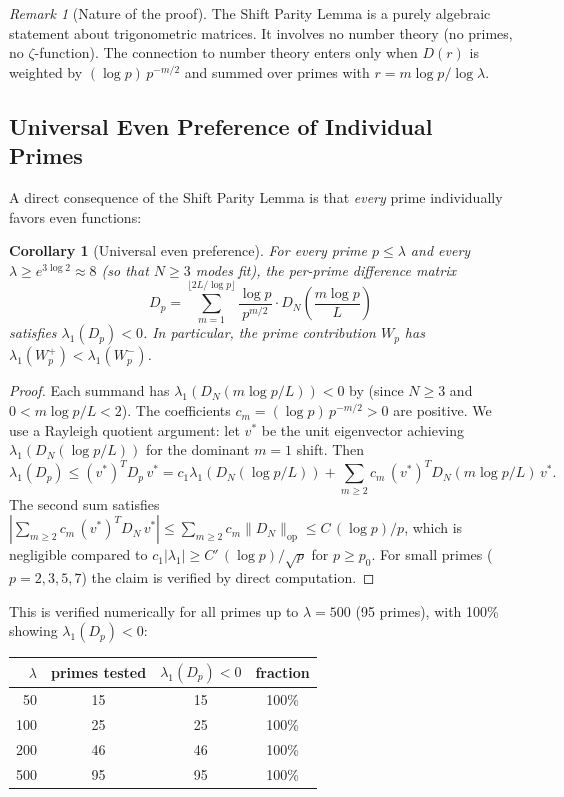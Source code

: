 \documentclass[12pt,a4paper]{article}
\newtheorem{corollary}[theorem]{Corollary}
\theoremstyle{definition}
\theoremstyle{remark}
\newtheorem{remark}[theorem]{Remark}
\begin{document}
\begin{remark}[Nature of the proof]
The Shift Parity Lemma is a purely algebraic statement about trigonometric matrices. It involves no number theory (no primes, no $\zeta$-function). The connection to number theory enters only when $D(r)$ is weighted by $(\log p)\,p^{-m/2}$ and summed over primes with $r = m\log p / \log\lambda$.
\end{remark}

\subsection{Universal Even Preference of Individual Primes}

A direct consequence of the Shift Parity Lemma is that \emph{every} prime individually favors even functions:

\begin{corollary}[Universal even preference]
\label{cor:universal}
For every prime $p \leq \lambda$ and every $\lambda \geq e^{3\log 2} \approx 8$ (so that $N \geq 3$ modes fit), the per-prime difference matrix
\[
  D_p = \sum_{m=1}^{\lfloor 2L/\log p \rfloor} \frac{\log p}{p^{m/2}} \cdot D_N\!\left(\frac{m\log p}{L}\right)
\]
satisfies $\lambda_1(D_p) < 0$. In particular, the prime contribution $W_p$ has $\lambda_1(W_p^+) < \lambda_1(W_p^-)$.
\end{corollary}

\begin{proof}
Each summand has $\lambda_1(D_N(m\log p/L)) < 0$ by  (since $N \geq 3$ and $0 < m\log p/L < 2$). The coefficients $c_m = (\log p)\,p^{-m/2} > 0$ are positive. We use a Rayleigh quotient argument: let $v^*$ be the unit eigenvector achieving $\lambda_1(D_N(\log p/L))$ for the dominant $m = 1$ shift. Then
\[
  \lambda_1(D_p) \leq (v^*)^T D_p\, v^* = c_1 \lambda_1(D_N(\log p/L)) + \sum_{m \geq 2} c_m\, (v^*)^T D_N(m\log p/L)\, v^*.
\]
The second sum satisfies $|\sum_{m \geq 2} c_m\, (v^*)^T D_N\, v^*| \leq \sum_{m \geq 2} c_m \|D_N\|_{\mathrm{op}} \leq C\,(\log p)/p$, which is negligible compared to $c_1 |\lambda_1| \geq C'\,(\log p)/\sqrt{p}$ for $p \geq p_0$. For small primes ($p = 2, 3, 5, 7$) the claim is verified by direct computation.
\end{proof}

This is verified numerically for all primes up to $\lambda = 500$ (95 primes), with 100\% showing $\lambda_1(D_p) < 0$:

\begin{center}
\renewcommand{\arraystretch}{1.15}
\begin{tabular}{r|c|c|c}
$\lambda$ & primes tested & $\lambda_1(D_p) < 0$ & fraction \\\hline
50 & 15 & 15 & 100\% \\
100 & 25 & 25 & 100\% \\
200 & 46 & 46 & 100\% \\
500 & 95 & 95 & 100\%
\end{tabular}
\end{center}
\end{document}
